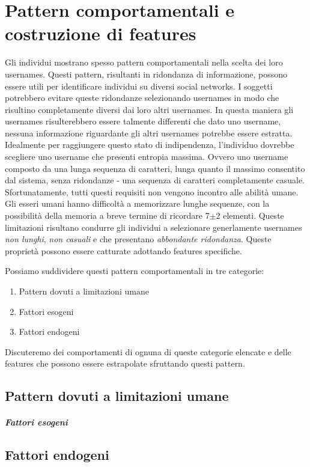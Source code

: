 \chapter{Pattern comportamentali e costruzione di features}
\label{cap2}
Gli individui mostrano spesso pattern comportamentali nella scelta dei loro usernames. Questi pattern, risultanti in ridondanza di informazione, possono essere utili per identificare individui su diversi social networks.
I soggetti potrebbero evitare queste ridondanze selezionando usernames in modo che risultino completamente diversi dai loro altri usernames. In questa maniera gli usernames risulterebbero essere talmente differenti che dato uno username, nessuna informazione riguardante gli altri usernames potrebbe essere estratta.
Idealmente per raggiungere questo stato di indipendenza, l'individuo dovrebbe scegliere uno username che presenti entropia massima. Ovvero uno username composto da una lunga sequenza di caratteri, lunga quanto il massimo consentito dal sistema, senza ridondanze - una sequenza di caratteri completamente casuale.
Sfortunatamente, tutti questi requisiti non vengono incontro alle abilità umane. Gli esseri umani hanno difficoltà a memorizzare lunghe sequenze, con la possibilità della memoria a breve termine di ricordare 7$\pm$2 elementi. Queste limitazioni risultano condurre gli individui a selezionare generlamente usernames \textit{non lunghi}, \textit{non casuali} e che presentano \textit{abbondante ridondanza}.
Queste proprietà possono essere catturate adottando features specifiche.

Possiamo suddividere questi pattern comportamentali in tre categorie:
\begin{enumerate}
  \item Pattern dovuti a limitazioni umane
  \item Fattori esogeni
  \item Fattori endogeni
\end{enumerate}

Discuteremo dei comportamenti di ognuna di queste categorie elencate e delle features che possono essere estrapolate sfruttando questi pattern.


\section{Pattern dovuti a limitazioni umane}
\paragraph{Fattori esogeni}
\section{Fattori endogeni}
